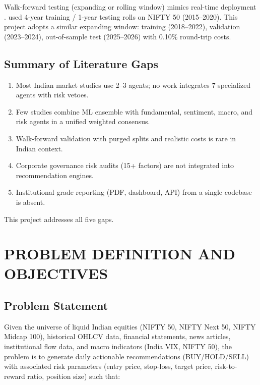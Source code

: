 \documentclass[12pt,a4paper]{report}
\begin{document}
Walk-forward testing (expanding or rolling window) mimics real-time deployment \cite{priestley2018walk}. \cite{bhat2021machine} used 4-year training / 1-year testing rolls on NIFTY 50 (2015--2020). This project adopts a similar expanding window: training (2018--2022), validation (2023--2024), out-of-sample test (2025--2026) with 0.10\% round-trip costs.

\section{Summary of Literature Gaps}
\begin{enumerate}
    \item Most Indian market studies use 2--3 agents; no work integrates 7 specialized agents with risk vetoes.
    \item Few studies combine ML ensemble with fundamental, sentiment, macro, and risk agents in a unified weighted consensus.
    \item Walk-forward validation with purged splits and realistic costs is rare in Indian context.
    \item Corporate governance risk audits (15+ factors) are not integrated into recommendation engines.
    \item Institutional-grade reporting (PDF, dashboard, API) from a single codebase is absent.
\end{enumerate}
This project addresses all five gaps.

\chapter{PROBLEM DEFINITION AND OBJECTIVES}

\section{Problem Statement}
Given the universe of liquid Indian equities (NIFTY 50, NIFTY Next 50, NIFTY Midcap 100), historical OHLCV data, financial statements, news articles, institutional flow data, and macro indicators (India VIX, NIFTY 50), the problem is to generate daily actionable recommendations (BUY/HOLD/SELL) with associated risk parameters (entry price, stop-loss, target price, risk-to-reward ratio, position size) such that:
\end{document}
